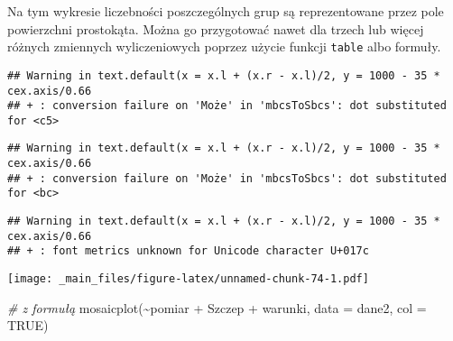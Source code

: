 \documentclass[
]{book}
\newenvironment{Shaded}{\begin{snugshade}}{\end{snugshade}}
\newcommand{\AttributeTok}[1]{\textcolor[rgb]{0.77,0.63,0.00}{#1}}
\newcommand{\CommentTok}[1]{\textcolor[rgb]{0.56,0.35,0.01}{\textit{#1}}}
\newcommand{\ConstantTok}[1]{\textcolor[rgb]{0.00,0.00,0.00}{#1}}
\newcommand{\FunctionTok}[1]{\textcolor[rgb]{0.00,0.00,0.00}{#1}}
\newcommand{\NormalTok}[1]{#1}
\newcommand{\SpecialCharTok}[1]{\textcolor[rgb]{0.00,0.00,0.00}{#1}}
\newcommand{\StringTok}[1]{\textcolor[rgb]{0.31,0.60,0.02}{#1}}
\begin{document}
Na tym wykresie liczebności poszczególnych grup są reprezentowane przez pole powierzchni prostokąta. Można go przygotować nawet dla trzech lub więcej różnych zmiennych wyliczeniowych poprzez użycie funkcji \texttt{table} albo formuły.

\begin{Shaded}
\end{Shaded}

\begin{verbatim}
## Warning in text.default(x = x.l + (x.r - x.l)/2, y = 1000 - 35 * cex.axis/0.66
## + : conversion failure on 'Może' in 'mbcsToSbcs': dot substituted for <c5>
\end{verbatim}

\begin{verbatim}
## Warning in text.default(x = x.l + (x.r - x.l)/2, y = 1000 - 35 * cex.axis/0.66
## + : conversion failure on 'Może' in 'mbcsToSbcs': dot substituted for <bc>
\end{verbatim}

\begin{verbatim}
## Warning in text.default(x = x.l + (x.r - x.l)/2, y = 1000 - 35 * cex.axis/0.66
## + : font metrics unknown for Unicode character U+017c
\end{verbatim}

\texttt{[image: \_main\_files/figure-latex/unnamed-chunk-74-1.pdf]}

\begin{Shaded}
\begin{Highlighting}[]
\CommentTok{\# z formułą}
\FunctionTok{mosaicplot}\NormalTok{(}\SpecialCharTok{\textasciitilde{}}\NormalTok{pomiar }\SpecialCharTok{+}\NormalTok{ Szczep }\SpecialCharTok{+}\NormalTok{ warunki, }\AttributeTok{data =}\NormalTok{ dane2, }\AttributeTok{col =} \ConstantTok{TRUE}\NormalTok{)}
\end{Highlighting}
\end{Shaded}
\end{document}
